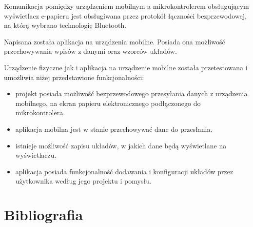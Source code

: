 \documentclass[a4paper,12pt, twoside]{article}
\begin{document}
    	Komunikacja pomiędzy urządzeniem mobilnym a mikrokontrolerem obsługującym wyświetlacz e-papieru jest obsługiwana przez protokół łączności bezprzewodowej, na którą wybrano technologię Bluetooth.
    	
    	Napisana została aplikacja na urządzenia mobilne. Posiada ona możliwość przechowywania wpisów z danymi oraz wzorców układów.
    	
    	Urządzenie fizyczne jak i aplikacja na urządzenie mobilne została przetestowana i umożliwia niżej przedstawione funkcjonalności:
    	\begin{itemize}
    	    \item projekt posiada możliwość bezprzewodowego przesyłania danych z urządzenia mobilnego, na ekran papieru elektronicznego podłączonego do mikrokontrolera.
    	    \item aplikacja mobilna jest w stanie przechowywać dane do przesłania.
    	    \item istnieje możliwość zapisu układów, w jakich dane będą wyświetlane na wyświetlaczu.
    	    \item aplikacja posiada funkcjonalność dodawania i konfiguracji układów przez użytkownika według jego projektu i pomysłu.
    	\end{itemize}
    	
       
        
    	\newpage
    	\section{Bibliografia}
    	
\end{document}
